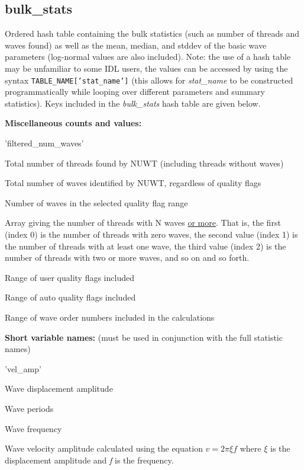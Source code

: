\documentclass{article}
\begin{document}
\subsection{bulk\_stats}
Ordered hash table containing the bulk statistics (such as number of threads and waves found) as well as the mean, median, and stddev of the basic wave parameters (log-normal values are also included). Note: the use of a hash table may be unfamiliar to some IDL users, the values can be accessed by using the syntax \texttt{TABLE\_NAME['stat\_name']} (this allows for \textit{stat\_name} to be constructed programmatically while looping over different parameters and summary statistics). Keys included in the \textit{bulk\_stats} hash table are given below. \newline

\textbf{Miscellaneous counts and values:}
\begin{labeling}{'filtered\_num\_waves'} 
\item['num\_threads'] Total number of threads found by NUWT (including threads without waves)
\item['num\_waves'] Total number of waves identified by NUWT, regardless of quality flags
\item['filtered\_num\_waves'] Number of waves in the selected quality flag range
\item['wave\_counts'] Array giving the number of threads with N waves \underline{or more}. That is, the first (index 0) is the number of threads with zero waves, the second value (index 1) is the number of threads with at least one wave, the third value (index 2) is the number of threads with two or more waves, and so on and so forth.
\item['user\_flag\_range'] Range of user quality flags included
\item['auto\_flag\_range'] Range of auto quality flags included
\item['wave\_order\_range'] Range of wave order numbers included in the calculations \newline
\end{labeling}


\textbf{Short variable names:} (must be used in conjunction with the full statistic names)
\begin{labeling}{'vel\_amp'}
\item['amp'] Wave displacement amplitude
\item['period'] Wave periods
\item['freq'] Wave frequency
\item['vel\_amp'] Wave velocity amplitude calculated using the equation $v = 2\pi\xi f$ where $\xi$ is the displacement amplitude and \textit{f} is the frequency.\newline
\end{labeling}
\end{document}
